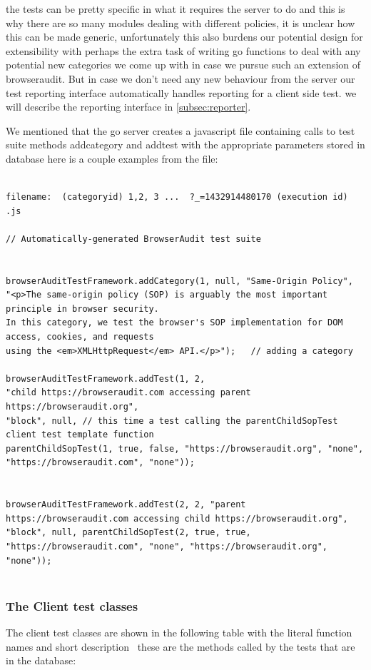 the tests can be pretty specific in what it requires the server to do and this is why there are so many modules dealing with different policies,
it is unclear how this can be made generic, unfortunately this also burdens our potential design for extensibility with perhaps the extra task of writing
go functions to deal with any potential new categories we come up with in case we pursue such an extension of browseraudit.
But in case we don't need any new behaviour from the server our test reporting interface automatically handles reporting for a client side test. 
we will describe the reporting interface in \ref{subsec:reporter}.

We mentioned that the go server creates a javascript file containing calls to test suite methods addcategory and addtest with the appropriate parameters stored in database
here is a couple examples from the file:
\begin{verbatim}

filename:  (categoryid) 1,2, 3 ...  ?_=1432914480170 (execution id) .js

// Automatically-generated BrowserAudit test suite


browserAuditTestFramework.addCategory(1, null, "Same-Origin Policy", 
"<p>The same-origin policy (SOP) is arguably the most important principle in browser security. 
In this category, we test the browser's SOP implementation for DOM access, cookies, and requests    
using the <em>XMLHttpRequest</em> API.</p>");	// adding a category

browserAuditTestFramework.addTest(1, 2,
"child https://browseraudit.com accessing parent https://browseraudit.org", 
"block", null, // this time a test calling the parentChildSopTest client test template function
parentChildSopTest(1, true, false, "https://browseraudit.org", "none", "https://browseraudit.com", "none")); 


browserAuditTestFramework.addTest(2, 2, "parent https://browseraudit.com accessing child https://browseraudit.org", "block", null, parentChildSopTest(2, true, true, "https://browseraudit.com", "none", "https://browseraudit.org", "none"));
 
\end{verbatim}

\subsubsection{The Client test classes}
\label{subsec:client}

The client test classes are shown in the following table with the literal function names and short description \
these are the methods called by the tests that are in the database:

